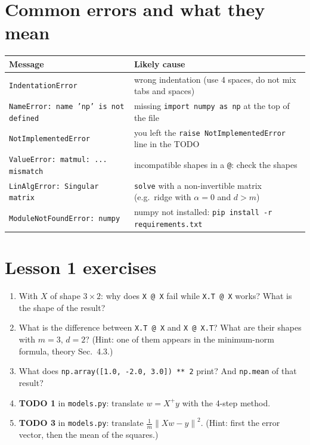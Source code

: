 \documentclass[11pt,a4paper]{article}
\newcommand{\norm}[1]{\left\lVert #1 \right\rVert}
\begin{document}
\section{Common errors and what they mean}
\begin{center}
\begin{tabular}{@{}p{5.2cm}p{9.3cm}@{}}
\toprule
Message & Likely cause \\
\midrule
\texttt{IndentationError} & wrong indentation (use 4 spaces, do not mix tabs and spaces) \\
\texttt{NameError: name 'np' is not defined} & missing \texttt{import numpy as np} at the top of the file \\
\texttt{NotImplementedError} & you left the \texttt{raise NotImplementedError} line in the TODO \\
\texttt{ValueError: matmul: ... mismatch} & incompatible shapes in a \texttt{@}: check the shapes \\
\texttt{LinAlgError: Singular matrix} & \texttt{solve} with a non-invertible matrix (e.g.\ ridge with $\alpha=0$ and $d>m$) \\
\texttt{ModuleNotFoundError: numpy} & numpy not installed: \texttt{pip install -r requirements.txt} \\
\bottomrule
\end{tabular}
\end{center}

\section{Lesson 1 exercises}
\begin{enumerate}
  \item With $X$ of shape $3\times 2$: why does \texttt{X @ X} fail while \texttt{X.T @ X} works? What is the shape of the result?
  \item What is the difference between \texttt{X.T @ X} and \texttt{X @ X.T}? What are their shapes with $m=3$, $d=2$?
        (Hint: one of them appears in the minimum-norm formula, theory Sec.~4.3.)
  \item What does \texttt{np.array([1.0, -2.0, 3.0]) ** 2} print? And \texttt{np.mean} of that result?
  \item \textbf{TODO 1} in \texttt{models.py}: translate $w = X^{+}y$ with the 4-step method.
  \item \textbf{TODO 3} in \texttt{models.py}: translate $\frac{1}{m}\norm{Xw - y}^2$. (Hint: first the error vector, then the mean of the squares.)
\end{enumerate}
\end{document}
